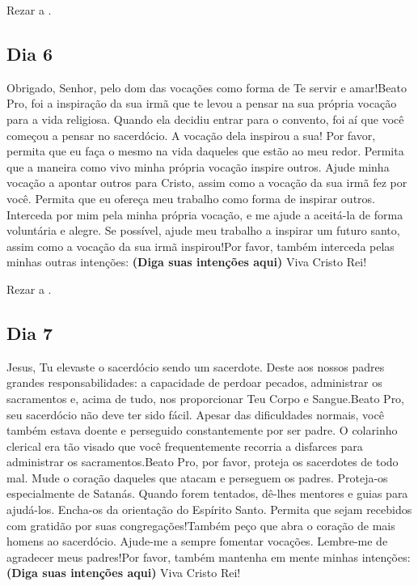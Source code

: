 \documentclass[a4paper,14pt,twoside]{extarticle} \usepackage[utf8]{inputenc}
\begin{document}
Rezar a \textbf{}.

\subsection{Dia 6}

Obrigado, Senhor, pelo dom das vocações como forma de Te servir e amar!Beato Pro, foi a inspiração da sua irmã que te levou a pensar na sua própria vocação para a vida religiosa. Quando ela decidiu entrar para o convento, foi aí que você começou a pensar no sacerdócio. A vocação dela inspirou a sua!
Por favor, permita que eu faça o mesmo na vida daqueles que estão ao meu redor. Permita que a maneira como vivo minha própria vocação inspire outros. Ajude minha vocação a apontar outros para Cristo, assim como a vocação da sua irmã fez por você. Permita que eu ofereça meu trabalho como forma de inspirar outros. Interceda por mim pela minha própria vocação, e me ajude a aceitá-la de forma voluntária e alegre. Se possível, ajude meu trabalho a inspirar um futuro santo, assim como a vocação da sua irmã inspirou!Por favor, também interceda pelas minhas outras intenções: \textbf{(Diga suas intenções aqui)} Viva Cristo Rei!

Rezar a \textbf{}.

\subsection{Dia 7}

Jesus, Tu elevaste o sacerdócio sendo um sacerdote. Deste aos nossos padres grandes responsabilidades: a capacidade de perdoar pecados, administrar os sacramentos e, acima de tudo, nos proporcionar Teu Corpo e Sangue.Beato Pro, seu sacerdócio não deve ter sido fácil. Apesar das dificuldades normais, você também estava doente e perseguido constantemente por ser padre. O colarinho clerical era tão visado que você frequentemente recorria a disfarces para administrar os sacramentos.Beato Pro, por favor, proteja os sacerdotes de todo mal. Mude o coração daqueles que atacam e perseguem os padres. Proteja-os especialmente de Satanás. Quando forem tentados, dê-lhes mentores e guias para ajudá-los. Encha-os da orientação do Espírito Santo. Permita que sejam recebidos com gratidão por suas congregações!Também peço que abra o coração de mais homens ao sacerdócio. Ajude-me a sempre fomentar vocações. Lembre-me de agradecer meus padres!Por favor, também mantenha em mente minhas intenções: \textbf{(Diga suas intenções aqui)} Viva Cristo Rei!
\end{document}
